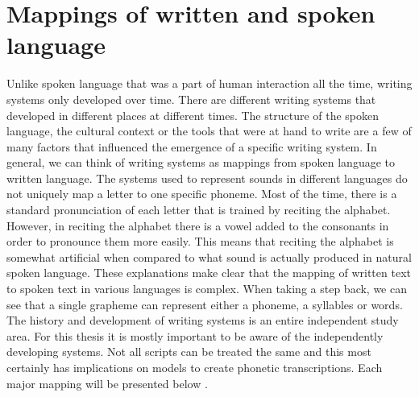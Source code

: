 \section{Mappings of written and spoken language}
\label{writing-sys}
Unlike spoken language that was a part of human interaction all the time, writing systems only developed over time. There are different writing systems that developed in different places at different times. The structure of the spoken language, the cultural context or the tools that were at hand to write are a few of many factors that influenced the emergence of a specific writing system. In general, we can think of writing systems as mappings from spoken language to written language. The systems used to represent sounds in different languages do not uniquely map a letter to one specific phoneme. Most of the time, there is a standard pronunciation of each letter that is trained by reciting the alphabet. However, in reciting the alphabet there is a vowel added to the consonants in order to pronounce them more easily. This means that reciting the alphabet is somewhat artificial when compared to what sound is actually produced in natural spoken language. These explanations make clear that the mapping of written text to spoken text in various languages is complex. When taking a step back, we can see that a single grapheme can represent either a phoneme, a syllables or words. The history and development of writing systems is an entire independent study area. For this thesis it is mostly important to be aware of the independently developing systems. Not all scripts can be treated the same and this most certainly has implications on models to create phonetic transcriptions. Each major mapping will be presented below \citep{writing-systems}.

